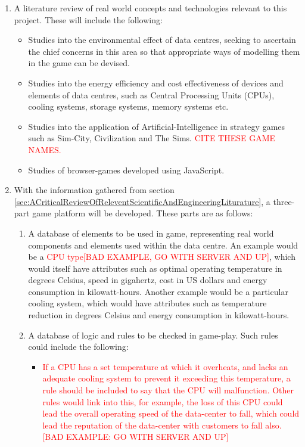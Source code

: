 \begin{enumerate}
\item A literature review of real world concepts and technologies relevant to this project. These will include the following:
\begin{itemize}
\item Studies into the environmental effect of \gls{data centre}s, seeking to ascertain the chief concerns in this area so that appropriate ways of modelling them in the game can be devised.

\item Studies into the energy efficiency and cost effectiveness of devices and elements of \gls{data centre}s, such as Central Processing Units (CPUs), cooling systems, storage systems, memory systems etc.

\item Studies into the application of Artificial-Intelligence in strategy games such as Sim-City, Civilization and The Sims. \textcolor{red}{CITE THESE GAME NAMES.}

\item Studies of browser-games developed using JavaScript.
\end{itemize}

\item With the information gathered from section \ref{sec:ACriticalReviewOfReleventScientificAndEngineeringLiturature}, a three-part game platform will be developed. These parts are as follows:
\begin{enumerate}
\item A database of elements to be used in game, representing real world components and elements used within the \gls{data centre}. An example would be a \textcolor{red}{CPU type[BAD EXAMPLE, GO WITH SERVER AND UP]}, which would itself have attributes such as optimal operating temperature in degrees Celsius, speed in gigahertz, cost in US dollars and energy consumption in kilowatt-hours. Another example would be a particular cooling system, which would have attributes such as temperature reduction in degrees Celsius and energy consumption in kilowatt-hours.

\item A database of logic and rules to be checked in game-play. Such rules could include the following:
\begin{itemize}
\item \textcolor{red}{If a CPU has a set temperature at which it overheats, and lacks an adequate cooling system to prevent it exceeding this temperature, a rule should be included to say that  the CPU will malfunction. Other rules would link into this, for example, the loss of this CPU could lead the overall operating speed of the data-center to fall, which could lead the reputation of the data-center with customers to fall also.[BAD EXAMPLE: GO WITH SERVER AND UP]}


\end{itemize}
\end{enumerate}
\end{enumerate}
